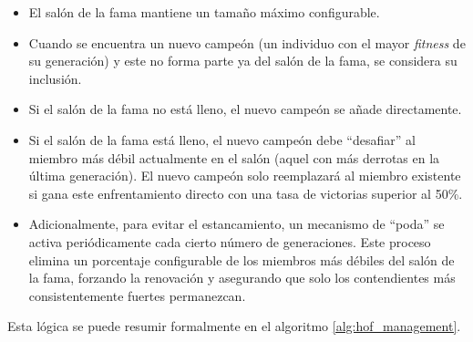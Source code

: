 \begin{itemize}
	\item El salón de la fama mantiene un tamaño máximo configurable.
	\item Cuando se encuentra un nuevo campeón (un individuo con el mayor \textit{fitness} de su generación) y este no forma parte ya del salón de la fama, se considera su inclusión.
	\item Si el salón de la fama no está lleno, el nuevo campeón se añade directamente.
	\item Si el salón de la fama está lleno, el nuevo campeón debe ``desafiar'' al miembro más débil actualmente en el salón (aquel con más derrotas en la última generación). El nuevo campeón solo reemplazará al miembro existente si gana este enfrentamiento directo con una tasa de victorias superior al 50\%.
	\item Adicionalmente, para evitar el estancamiento, un mecanismo de ``poda'' se activa periódicamente cada cierto número de generaciones. Este proceso elimina un porcentaje configurable de los miembros más débiles del salón de la fama, forzando la renovación y asegurando que solo los contendientes más consistentemente fuertes permanezcan.
\end{itemize}

Esta lógica se puede resumir formalmente en el algoritmo \ref{alg:hof_management}.

